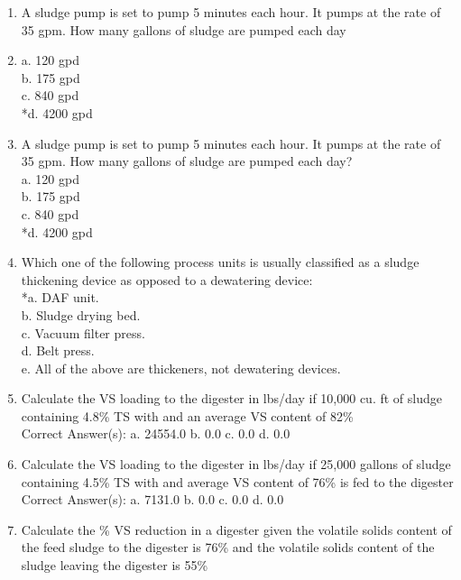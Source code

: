 \documentclass{article}
\begin{document}
\begin{enumerate}
\item  A sludge pump is set to pump 5 minutes each hour. It pumps at the rate of 35 gpm. How many gallons of sludge are pumped each day\\

\item  a. 120 gpd \\
b. 175 gpd \\
c. 840 gpd \\
*d. 4200 gpd \\

\item  A sludge pump is set to pump 5 minutes each hour. It pumps at the rate of 35 gpm. How many gallons of sludge are pumped each day? \\

a. 120 gpd \\
b. 175 gpd \\
c. 840 gpd \\
*d. 4200 gpd \\

\item  Which one of the following process units is usually classified as a sludge thickening device as opposed to a dewatering device: \\

*a. DAF unit. \\
b. Sludge drying bed. \\
c. Vacuum filter press. \\
d. Belt press. \\
e. All of the above are thickeners, not dewatering devices. \\

\item  Calculate the VS loading to the digester in lbs/day if 10,000 cu. ft of sludge containing 4.8\% TS with and an average VS content of 82\%\\

Correct Answer(s):
a. 24554.0
b. 0.0
c. 0.0
d. 0.0 \\

\item  Calculate the VS loading to the digester in lbs/day if 25,000 gallons of sludge containing 4.5\% TS with and average VS content of 76\% is fed to the digester\\

Correct Answer(s):
a. 7131.0
b. 0.0
c. 0.0
d. 0.0 \\

\item  Calculate the \% VS reduction in a digester given the volatile solids content of the feed sludge to the digester is 76\% and the volatile solids content of the sludge leaving the digester is 55\%\\


\end{enumerate}
\end{document}
